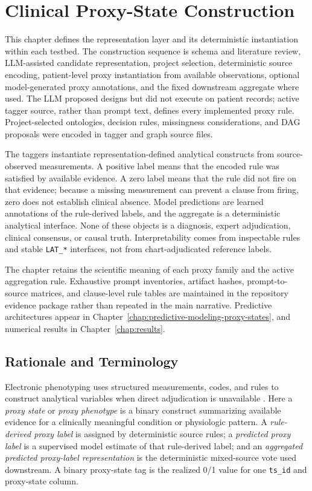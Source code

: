 \chapter{Clinical Proxy-State Construction}
\label{chap:clinical-proxy-state-construction}

This chapter defines the representation layer and its deterministic instantiation within each testbed.  The construction sequence is schema and literature review, LLM-assisted candidate representation, project selection, deterministic source encoding, patient-level proxy instantiation from available observations, optional model-generated proxy annotations, and the fixed downstream aggregate where used.  The LLM proposed designs but did not execute on patient records; active tagger source, rather than prompt text, defines every implemented proxy rule.  Project-selected ontologies, decision rules, missingness considerations, and DAG proposals were encoded in tagger and graph source files.

The taggers instantiate representation-defined analytical constructs from source-observed measurements.  A positive label means that the encoded rule was satisfied by available evidence.  A zero label means that the rule did not fire on that evidence; because a missing measurement can prevent a clause from firing, zero does not establish clinical absence.  Model predictions are learned annotations of the rule-derived labels, and the aggregate is a deterministic analytical interface.  None of these objects is a diagnosis, expert adjudication, clinical consensus, or causal truth.  Interpretability comes from inspectable rules and stable \texttt{LAT\_*} interfaces, not from chart-adjudicated reference labels.

The chapter retains the scientific meaning of each proxy family and the active aggregation rule.  Exhaustive prompt inventories, artifact hashes, prompt-to-source matrices, and clause-level rule tables are maintained in the repository evidence package rather than repeated in the main narrative.  Predictive architectures appear in Chapter~\ref{chap:predictive-modeling-proxy-states}, and numerical results in Chapter~\ref{chap:results}.

\section{Rationale and Terminology}
\label{sec:clinical-proxy-state-construction:rationale-terminology}

Electronic phenotyping uses structured measurements, codes, and rules to construct analytical variables when direct adjudication is unavailable \cite{banda_2018_electronic_phenotyping}.  Here a \emph{proxy state} or \emph{proxy phenotype} is a binary construct summarizing available evidence for a clinically meaningful condition or physiologic pattern.  A \emph{rule-derived proxy label} is assigned by deterministic source rules; a \emph{predicted proxy label} is a supervised model estimate of that rule-derived label; and an \emph{aggregated predicted proxy-label representation} is the deterministic mixed-source vote used downstream.  A binary proxy-state tag is the realized 0/1 value for one \texttt{ts\_id} and proxy-state column.

